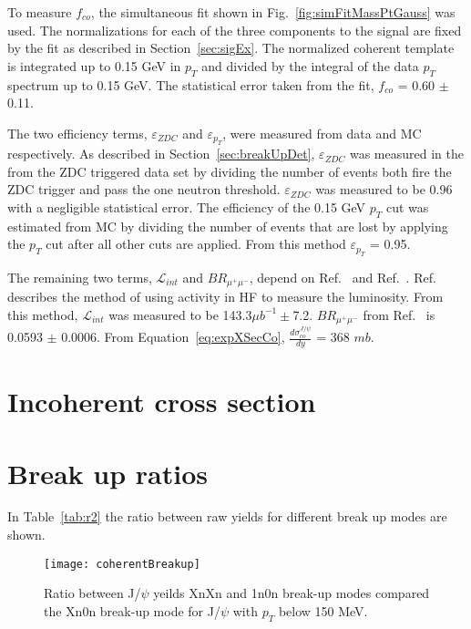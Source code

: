   To measure $f_{co}$, the simultaneous fit shown in 
    Fig.~\ref{fig:simFitMassPtGauss} was used.
  The normalizations for each of the three components to the signal are fixed 
  by the fit as described in Section~\ref{sec:sigEx}.
  The normalized coherent template is integrated up to 0.15 GeV in $p_{T}$ and
    divided by the integral of the data $p_{T}$ spectrum up to 0.15 GeV.
  The statistical error taken from the fit, $f_{co}$ = 0.60 $\pm$ 0.11.

  The two efficiency terms, $\varepsilon_{ZDC}$ and $\varepsilon_{p_{T}}$, were
    measured from data and MC respectively.
  As described in Section~\ref{sec:breakUpDet}, $\varepsilon_{ZDC}$ was 
    measured in the from the ZDC triggered data set by dividing the number of 
    events both fire the ZDC trigger and pass the one neutron threshold.
  $\varepsilon_{ZDC}$ was measured to be 0.96 with a negligible statistical 
    error.
  The efficiency of the 0.15 GeV $p_{T}$ cut was estimated from MC by dividing 
    the number of events that are lost by applying the $p_{T}$ cut after all
    other cuts are applied. 
  From this method $\varepsilon_{p_{T}}$ = 0.95.

  The remaining two terms, $\mathcal{L}_{int}$ and $BR_{\mu^{+}\mu^{-}}$, 
    depend on Ref.~\cite{cmsLumi} and Ref.~\cite{pdg}.
  Ref.~\cite{cmsLumi} describes the method of using activity in HF to measure 
    the luminosity. 
  From this method, $\mathcal{L}_{int}$ was measured to be 143.3$\mu b^{-1}\pm$7.2.
  $BR_{\mu^{+}\mu^{-}}$ from Ref.~\cite{pdg} is 0.0593 $\pm$ 0.0006.
  From Equation~\ref{eq:expXSecCo}, $\frac{d\sigma^{J/\psi}_{co}}{dy}$ = 368 $mb$.

  \section{Incoherent cross section}
  \section{Break up ratios}
    In Table~\ref{tab:r2} the ratio between raw yields for different break up 
      modes are shown.
    \begin{figure}[!Hhtb]
      \centering
      \texttt{[image: coherentBreakup]}
      \caption{Ratio between J/$\psi$ yeilds XnXn and 1n0n break-up modes 
        compared the Xn0n break-up mode for J/$\psi$ with $p_{T}$ below 150 
        MeV.}
      \label{fig:coherentBreakUp}
    \end{figure}

